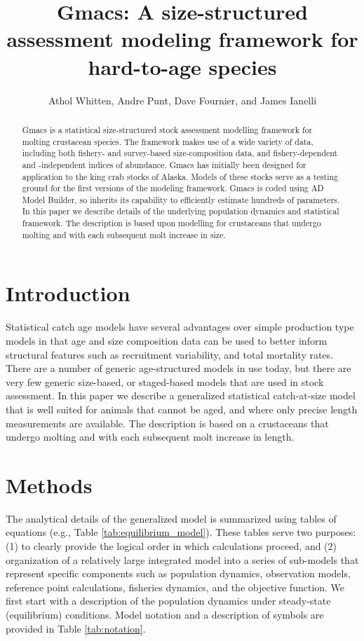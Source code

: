 \documentclass[12pt,letterpaper]{article}
\title{Gmacs: A size-structured assessment modeling framework for hard-to-age species}
\author{Athol Whitten, Andre Punt, Dave Fournier, and James Ianelli}
\begin{document}
  \maketitle

  \begin{abstract}
    Gmacs is a statistical size-structured stock assessment modelling framework for molting crustacean species. The framework makes use of a wide variety of data, including both fishery- and survey-based size-composition data, and fishery-dependent and -independent indices of abundance. Gmacs has initially been designed for application to the king crab stocks of Alaska. Models of these stocks serve as a testing ground for the first versions of the modeling framework. Gmacs is coded using AD Model Builder, so inherits its capability to efficiently estimate hundreds of parameters. In this paper we describe details of the underlying population dynamics and statistical framework. The description is based upon modelling for crustaceans that undergo molting and with each subsequent molt increase in size.

  \end{abstract}


  \section*{Introduction} %
  \label{sec:introduction}

  Statistical catch age models have several advantages over simple production type models in that age and size composition data can be used to better inform structural features such as recruitment variability, and total mortality rates.  There are a number of generic age-structured models in use today, but there are very few generic size-based, or staged-based models that are used in stock assessment. In this paper we describe a generalized statistical catch-at-size model that is well suited for animals that cannot be aged, and where only precise length measurements are available. The description is based on a crustaceans that undergo molting and with each subsequent molt increase in length.


  \section*{Methods} %
  \label{sec:methods}
  The analytical details of the generalized model is summarized using tables of equations (e.g., Table \ref{tab:equilibrium_model}).   These tables serve two purposes: (1) to clearly provide the logical order in which calculations proceed, and (2) organization of a relatively large integrated model into a series of sub-models that represent specific components such as population dynamics, observation models, reference point calculations, fisheries dynamics, and the objective function.  We first start with a description of the population dynamics under steady-state (equilibrium) conditions.  Model notation and a description of symbols are provided in Table \ref{tab:notation}.
\end{document}
